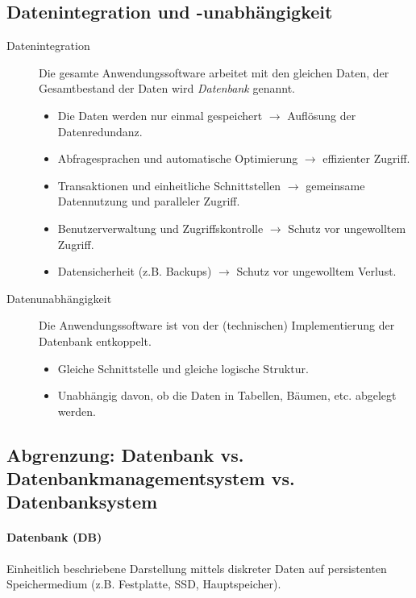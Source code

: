         \subsection{Datenintegration und -unabhängigkeit} %
            \begin{description}
            	\item[Datenintegration] Die gesamte Anwendungssoftware arbeitet mit den gleichen Daten, der Gesamtbestand der Daten wird \textit{Datenbank} genannt.
	            	\begin{itemize}
	            		\item Die Daten werden nur einmal gespeichert \(\rightarrow\) Auflösung der Datenredundanz.
	            		\item Abfragesprachen und automatische Optimierung \(\rightarrow\) effizienter Zugriff.
	            		\item Transaktionen und einheitliche Schnittstellen \(\rightarrow\) gemeinsame Datennutzung und paralleler Zugriff.
	            		\item Benutzerverwaltung und Zugriffskontrolle \(\rightarrow\) Schutz vor ungewolltem Zugriff.
	            		\item Datensicherheit (z.B. Backups) \(\rightarrow\) Schutz vor ungewolltem Verlust.
	            	\end{itemize}
	            \item[Datenunabhängigkeit] Die Anwendungssoftware ist von der (technischen) Implementierung der Datenbank entkoppelt.
		            \begin{itemize}
		            	\item Gleiche Schnittstelle und gleiche logische Struktur.
		            	\item Unabhängig davon, ob die Daten in Tabellen, Bäumen, etc. abgelegt werden.
		            \end{itemize}
        	\end{description}

        \subsection{Abgrenzung: Datenbank vs. Datenbankmanagementsystem vs. Datenbanksystem} %
            \paragraph{Datenbank (DB)}
                Einheitlich beschriebene Darstellung mittels diskreter Daten auf persistenten Speichermedium (z.B. Festplatte, SSD, Hauptspeicher).
            
